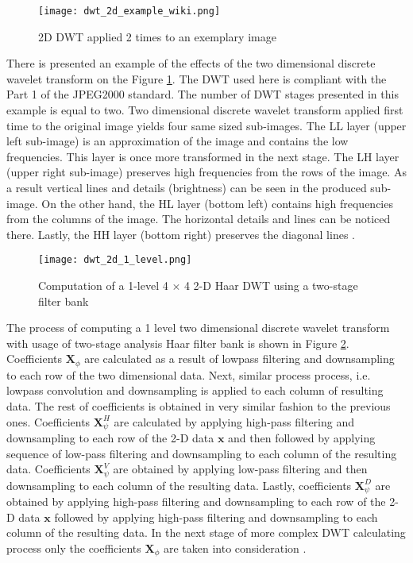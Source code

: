 \begin{figure}
    \centering
    \texttt{[image: dwt\_2d\_example\_wiki.png]}
    \caption{2D DWT applied 2 times to an exemplary image \cite{dwt_example_wiki}}
    \label{fig:dwt_2d_example_wiki}
\end{figure}

There is presented an example of the effects of the two dimensional discrete wavelet transform on the Figure \ref{fig:dwt_2d_example_wiki}.
The DWT used here is compliant with the Part 1 of the JPEG2000 standard. The number of DWT stages presented in this  
example is equal to two. Two dimensional discrete wavelet transform applied first time to the original image
yields four same sized sub-images. The LL layer (upper left sub-image) is an approximation of the image and contains the low frequencies.
This layer is once more transformed in the next stage. The LH layer (upper right sub-image) preserves high frequencies from the rows of the image.
As a result vertical lines and details (brightness) can be seen in the produced sub-image. On the other hand, the HL layer (bottom left)
contains high frequencies from the columns of the image. The horizontal details and lines can be noticed there.
Lastly, the HH layer (bottom right) preserves the diagonal lines \cite{dwt_example_wiki}.

\begin{figure}
    \centering
    \texttt{[image: dwt\_2d\_1\_level.png]}
    \caption{Computation of a 1-level 4 $\times$ 4 2-D Haar DWT using a two-stage filter bank \cite{dwt_impl}}
    \label{fig:dwt_2d_1_level}
\end{figure}

The process of computing a 1 level two dimensional discrete wavelet transform with usage of
two-stage analysis Haar filter bank is shown in Figure \ref{fig:dwt_2d_1_level}. Coefficients $\mathbf{X}_{\phi}$
are calculated as a result of lowpass filtering and downsampling to each row of the two dimensional
data. Next, similar process process, i.e. lowpass convolution and downsampling is applied to each column of
resulting data. The rest of coefficients is obtained in very similar fashion to the previous ones.
Coefficients $\mathbf{X}^{H}_{\psi}$ are calculated by applying high-pass filtering and downsampling to each row of the
2-D data $\mathbf{x}$ and then followed by applying sequence of low-pass filtering and downsampling to each
column of the resulting data. Coefficients $\mathbf{X}^{V}_{\psi}$ are obtained by applying low-pass filtering
and then downsampling to each column of the resulting data. Lastly, coefficients $\mathbf{X}^{D}_{\psi}$ are
obtained by applying high-pass filtering and downsampling to each row of the 2-D data $\mathbf{x}$ followed by
applying high-pass filtering and downsampling to each column of the resulting data. In the next stage of more
complex DWT calculating process only the coefficients $\mathbf{X}_{\phi}$ are taken into consideration \cite{dwt_impl}.

